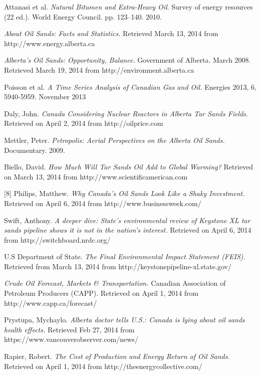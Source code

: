 \documentclass[11pt]{article}
\begin{document}
\begin{thebibliography}{9}
 Attanasi et al.  \emph{Natural Bitumen and Extra-Heavy Oil}. Survey of energy resources (22 ed.). World Energy Council. pp. 123–140. 2010.

 \emph{About Oil Sands: Facts and Statistics.} Retrieved March 13, 2014 from
http://www.energy.alberta.ca

 \emph{Alberta's Oil Sands: Opportunity, Balance.} Government of Alberta. March 2008. Retrieved March 19, 2014 from http://environment.alberta.ca

Poisson et al.  \emph{A Time Series Analysis of Canadian Gas and Oil.} Energies 2013, 6, 5940-5959. November 2013

Daly, John.  \emph{Canada Considering Nuclear Reactors in Alberta Tar Sands Fields.} Retrieved on April 2, 2014 from http://oilprice.com 

Mettler, Peter.  \emph{Petropolis: Aerial Perspectives on the Alberta Oil Sands.}
Documentary. 2009.

Biello, David.  \emph{How Much Will Tar Sands Oil Add to Global Warming?} Retrieved on March 13, 2014 from http://www.scientificamerican.com

[8] Philips, Matthew.  \emph{Why Canada’s Oil Sands Look Like a Shaky Investment.} Retrieved on April 6, 2014 from http://www.businessweek.com/ 

Swift, Anthony.  \emph{A deeper dive: State’s environmental review of Keystone XL tar sands pipeline shows it is not in the nation’s interest.} Retrieved on April 6, 2014 from http://switchboard.nrdc.org/ 

U.S Department of State.  \emph{The Final Environmental Impact Statement (FEIS).} Retrieved from March 13, 2014 from http://keystonepipeline-xl.state.gov/

 \emph{Crude Oil Forecast, Markets \& Transportation.} Canadian Association of Petroleum Producers (CAPP). Retrieved on April 1, 2014 from http://www.capp.ca/forecast/

Prystupa, Mychaylo.  \emph{Alberta doctor tells U.S.: Canada is lying about oil sands health effects.} Retrieved Feb 27, 2014 from https://www.vancouverobserver.com/news/

Rapier, Robert.  \emph{The Cost of Production and Energy Return of Oil Sands.} Retrieved on April 1, 2014 from http://theenergycollective.com/


\end{thebibliography}
\end{document}

